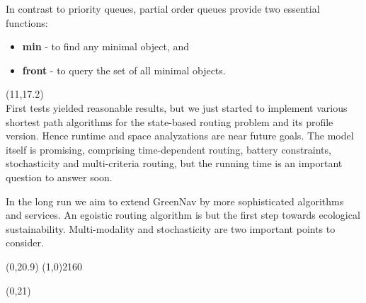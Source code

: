 \documentclass[a0,portrait]{a0poster}
\def\LHead#1{\noindent{\LARGE\color{oceangreen} #1}\smallskip}
\begin{document}
\begin{textblock}{4}
\begin{figure}[htp]
\end{figure}
In contrast to priority queues, partial order queues provide two
essential functions:
\begin{itemize}
  \item \textbf{min} - to find any minimal object, and
  \item \textbf{front} - to query the set of all minimal objects.
\end{itemize}
\end{textblock}

\begin{textblock}{4}(11,17.2)
\LHead{Conclusions and Future Work} \\
First tests yielded reasonable results, but we just started to implement
various shortest path algorithms for the state-based routing problem and
its profile version. Hence runtime and space analyzations are near future
goals. The model itself is promising, comprising time-dependent routing,
battery constraints, stochasticity and multi-criteria routing, but the
running time is an important question to answer soon.

In the long run we aim to extend GreenNav by more sophisticated algorithms
and services. An egoistic routing algorithm is but the first step towards
ecological sustainability. Multi-modality and stochasticity are two important
points to consider.
\end{textblock}

\begin{textblock}{15}(0,20.9)
\line(1,0){2160}
\end{textblock}

\begin{textblock}{15}(0,21)
\begin{multicols}{3}
\renewcommand{\refname}{\normalfont\LHead{Related Work}\vspace{-1cm}}
\nocite{*}

\end{multicols}
\end{textblock}
\end{document}
